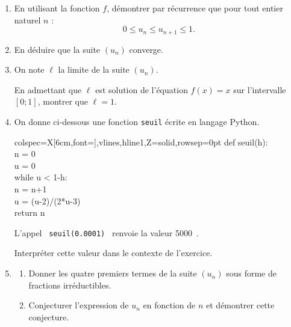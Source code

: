 \documentclass[10pt]{article}
\providecommand{\np}[2][]{{#2~#1}}
\begin{document}
	\begin{enumerate}
		\item En utilisant la fonction $f$, démontrer par récurrence que pour tout entier naturel $n$ :
		\[0 \leqslant  u_{n} \leqslant  u_{n+1} \leqslant  1.\]

		\item En déduire que la suite $(u_{n})$ converge.

		\item On note $\ell$ la limite de la suite $(u_{n})$.

		En admettant que $\ell$ est solution de l'équation $f(x)=x$ sur l'intervalle $[0 ; 1]$, montrer que $\ell=1$.

		\item On donne ci-dessous une fonction \texttt{seuil} écrite en langage Python.

		\begin{center}
		\begin{tblr}{colspec={X[6cm,font=\ttfamily]},vlines,hline{1,Z}={solid},rowsep=0pt}
			def seuil(h):\\
			\quad n = 0\\
			\quad u = 0\\
			\quad while u < 1-h:\\
			\quad \quad n = n+1\\
			\quad \quad u = (u-2)/(2*u-3)\\
			\quad return n\\
		\end{tblr}
		\end{center}

	L'appel ~\texttt{seuil(0.0001)}~ renvoie la valeur \np{5000}.

	Interpréter cette valeur dans le contexte de l'exercice.

	\item \begin{enumerate}
		\item Donner les quatre premiers termes de la suite $\left(u_{n}\right)$ sous forme de fractions irréductibles.

		\item Conjecturer l'expression de $u_{n}$ en fonction de $n$ et démontrer cette conjecture.
	\end{enumerate}
	\end{enumerate}
\end{document}
